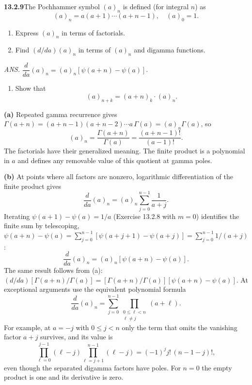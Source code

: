 \par\bigskip
\noindent\textbf{13.2.9}\quad The Pochhammer symbol $(a)_{n}$ is defined (for
integral $n$) as
\[
(a)_{n}=a(a+1)\cdots(a+n-1),\quad(a)_{0}=1.
\]
\begin{enumerate}
\item[(a)] Express $(a)_{n}$ in terms of factorials.
\item[(b)] Find $(d/da)(a)_{n}$ in terms of $(a)_{n}$ and digamma functions.
\end{enumerate}
\par\nobreak\hfill\emph{ANS.}\enspace
$\dfrac{d}{da}(a)_{n}=(a)_{n}\left[\psi(a+n)-\psi(a)\right]$.
\begin{enumerate}
\item[(c)] Show that
  \[
  (a)_{n+k}=(a+n)_{k}\cdot(a)_{n}.
  \]
\end{enumerate}
\par\smallskip
{}
\solution
{}
\textbf{(a)} Repeated gamma recurrence gives
$\Gamma(a+n)=(a+n-1)(a+n-2)\cdots a\,\Gamma(a)=(a)_n\Gamma(a)$,
so
\[
\boxed{(a)_n=\frac{\Gamma(a+n)}{\Gamma(a)}
=\frac{(a+n-1)!}{(a-1)!}}.
\]
The factorials have their generalized meaning.  The finite
product is a polynomial in $a$ and defines any removable value
of this quotient at gamma poles.

\textbf{(b)} At points where all factors are nonzero,
logarithmic differentiation of the finite product gives
\[
\frac{d}{da}(a)_n=(a)_n\sum_{j=0}^{n-1}\frac1{a+j}.
\]
Iterating $\psi(a+1)-\psi(a)=1/a$ (Exercise 13.2.8 with $m=0$)
identifies the finite sum by telescoping,
$\psi(a+n)-\psi(a)=\sum_{j=0}^{n-1}[\psi(a+j+1)-\psi(a+j)]
=\sum_{j=0}^{n-1}1/(a+j)$:
\[
\boxed{\frac{d}{da}(a)_n=(a)_n[\psi(a+n)-\psi(a)]}.
\]
The same result follows from (a):
$(d/da)[\Gamma(a+n)/\Gamma(a)]
=[\Gamma(a+n)/\Gamma(a)][\psi(a+n)-\psi(a)]$.
At exceptional arguments use the equivalent polynomial formula
\[
\frac{d}{da}(a)_n=
\sum_{j=0}^{n-1}\prod_{\substack{0\le\ell<n\\\ell\ne j}}(a+\ell).
\]
For example, at $a=-j$ with $0\le j<n$ only the term that omits the
vanishing factor $a+j$ survives, and its value is
\[
\prod_{\ell=0}^{j-1}(\ell-j)\prod_{\ell=j+1}^{n-1}(\ell-j)
=(-1)^jj!\,(n-1-j)!,
\]
even though the separated digamma factors have poles.  For $n=0$
the empty product is one and its derivative is zero.

